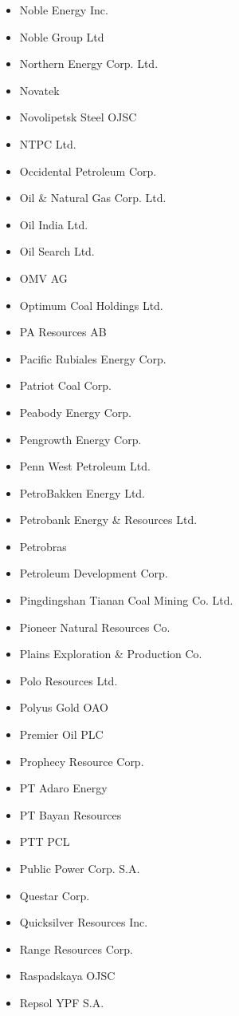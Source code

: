 \documentclass[10pt]{article}
\begin{document}
\begin{itemize}
  \item Noble Energy Inc.
  \item Noble Group Ltd
  \item Northern Energy Corp. Ltd.
  \item Novatek
  \item Novolipetsk Steel OJSC
  \item NTPC Ltd.
  \item Occidental Petroleum Corp.
  \item Oil \& Natural Gas Corp. Ltd.
  \item Oil India Ltd.
  \item Oil Search Ltd.
  \item OMV AG
  \item Optimum Coal Holdings Ltd.
  \item PA Resources AB
  \item Pacific Rubiales Energy Corp.
  \item Patriot Coal Corp.
  \item Peabody Energy Corp.
  \item Pengrowth Energy Corp.
  \item Penn West Petroleum Ltd.
  \item PetroBakken Energy Ltd.
  \item Petrobank Energy \& Resources Ltd.
  \item Petrobras
  \item Petroleum Development Corp.
  \item Pingdingshan Tianan Coal Mining Co. Ltd.
  \item Pioneer Natural Resources Co.
  \item Plains Exploration \& Production Co.
  \item Polo Resources Ltd.
  \item Polyus Gold OAO
  \item Premier Oil PLC
  \item Prophecy Resource Corp.
  \item PT Adaro Energy
  \item PT Bayan Resources
  \item PTT PCL
  \item Public Power Corp. S.A.
  \item Questar Corp.
  \item Quicksilver Resources Inc.
  \item Range Resources Corp.
  \item Raspadskaya OJSC
  \item Repsol YPF S.A.

\end{itemize}
\end{document}
